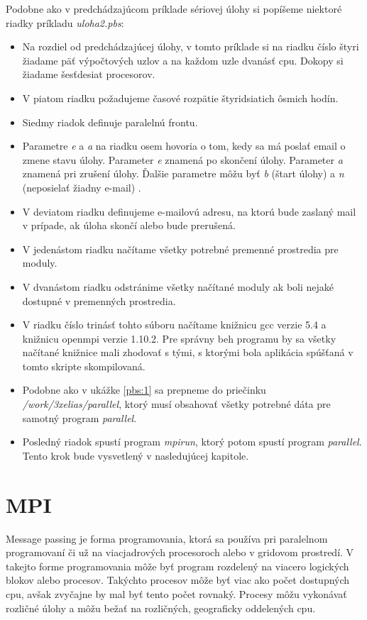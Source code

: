 Podobne ako v predchádzajúcom príklade sériovej úlohy si popíšeme niektoré riadky príkladu \textit{uloha2.pbs}:
\begin{itemize}
\item
  Na rozdiel od predchádzajúcej úlohy, v tomto príklade si na riadku číslo štyri žiadame päť výpočtových uzlov a na každom uzle dvanásť \acrshort{cpu}.
  Dokopy si žiadame šesťdesiat procesorov.
\item
  V piatom riadku požadujeme časové rozpätie štyridsiatich ôsmich hodín.
\item
  Siedmy riadok definuje paralelnú frontu.
\item
  Parametre \textit{e} a \textit{a} na riadku osem hovoria o tom, kedy sa má poslať email o zmene stavu úlohy.
  Parameter \textit{e} znamená po skončení úlohy.
  Parameter \textit{a} znamená pri zrušení úlohy.
  Ďalšie parametre môžu byť \textit{b} (štart úlohy) a \textit{n} (neposielať žiadny e-mail) \cite{cmd:qsub}.
\item
  V deviatom riadku definujeme e-mailovú adresu, na ktorú bude zaslaný mail v prípade, ak úloha skončí alebo bude prerušená.
\item
  V jedenástom riadku načítame všetky potrebné premenné prostredia pre moduly.
\item
  V dvanástom riadku odstránime všetky načítané moduly ak boli nejaké dostupné v premenných prostredia.
\item
  V riadku číslo trinásť tohto súboru načítame knižnicu gcc verzie 5.4 a knižnicu openmpi verzie 1.10.2.
  Pre správny beh programu by sa všetky načítané knižnice mali zhodovať s tými, s ktorými bola aplikácia spúšťaná v tomto skripte skompilovaná.
\item
  Podobne ako v ukážke \ref{pbs:1} sa prepneme do priečinku \textit{/work/3xelias/parallel}, ktorý musí obsahovať všetky potrebné dáta
  pre samotný program \textit{parallel}.
\item
  Posledný riadok spustí program \textit{mpirun}, ktorý potom spustí program \textit{parallel}. Tento krok bude vysvetlený v nasledujúcej kapitole.
\end{itemize}

\section{MPI}
Message passing je forma programovania, ktorá sa používa pri paralelnom programovaní či už na viacjadrových procesoroch alebo v gridovom prostredí.
V takejto forme programovania môže byť program rozdelený na viacero logických blokov alebo procesov.
Takýchto procesov môže byť viac ako počet dostupných \acrshort{cpu}, avšak zvyčajne by mal byť tento počet rovnaký.
Procesy môžu vykonávať rozličné úlohy a môžu bežať na rozličných, geograficky oddelených \acrshort{cpu}. \cite{mpibook}

